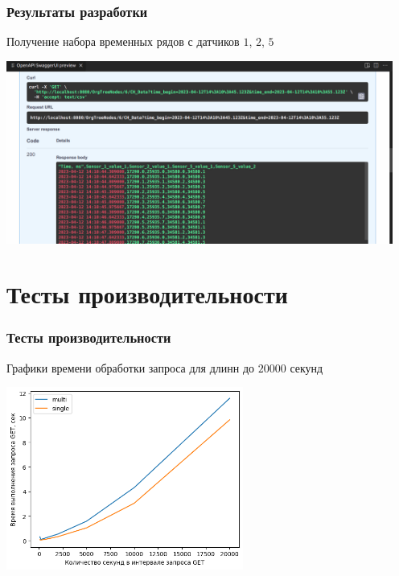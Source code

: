 \documentclass[pdf, hyperref={unicode}, aspectratio=169]{beamer}
\begin{document}
\begin{frame}
	\frametitle{Результаты разработки}
	
	Получение набора временных рядов с датчиков $1$, $2$, $5$
	
	\begin{center}
		\includegraphics[height = 6cm]{swagger8.png}
	\end{center}
\end{frame}


\section{Тесты производительности}
\begin{frame}
	\frametitle{Тесты производительности}
	
	Графики времени обработки запроса для длинн до $20000$ секунд
	
	\begin{center}
		\includegraphics[height = 6cm]{bench2e4.png}
	\end{center}
\end{frame}
\end{document}
